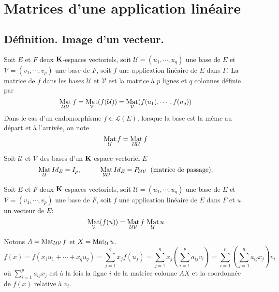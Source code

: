 \section{Matrices d'une application linéaire}
\subsection{Définition. Image d'un vecteur.}
\begin{defi}
 Soit $E$ et $F$ deux $\mathbf{K}$-espaces vectoriels, soit $\mathcal U=(u_1,\cdots,u_q)$ une base de $E$ et $\mathcal V=(v_1,\cdots,v_p)$ une base de $F$, soit $f$ une application linéaire de $E$ dans $F$. La matrice de $f$ dans les bases $\mathcal U$ et $\mathcal V$ est la matrice à $p$ lignes et $q$ colonnes définie par
\begin{displaymath}
 \mathop{\mathrm{Mat}}_{\mathcal U \mathcal V}f = \mathop{\mathrm{Mat}}_{\mathcal V}(f(\mathcal U))= \mathop{\mathrm{Mat}}_{\mathcal V}(f(u_1),\cdots,f(u_q))
\end{displaymath}
Dans le cas d'un endomorphisme $f\in\mathcal L(E)$, lorsque la base est la même au départ et à l'arrivée, on note
\begin{displaymath}
 \mathop{\mathrm{Mat}}_{\mathcal U}f =\mathop{\mathrm{Mat}}_{\mathcal U \mathcal U}f
\end{displaymath}
\end{defi}
\begin{rem}
 Soit $\mathcal U$ et $\mathcal V$ des bases d'un $\mathbf{K}$-espace vectoriel $E$
\[
 \mathop{\mathrm{Mat}}_{\mathcal U} Id_E = I_p , \hspace{1cm}
 \mathop{\mathrm{Mat}}_{\mathcal V \mathcal U}Id_E = P_{\mathcal U \mathcal V} \; \text{ (matrice de passage).}
\]
\end{rem}

\begin{propn} \label{matimagevect}
 Soit $E$ et $F$ deux $\mathbf{K}$-espaces vectoriels, soit $\mathcal U=(u_1,\cdots,u_q)$ une base de $E$ et $\mathcal V=(v_1,\cdots,v_p)$ une base de $F$, soit $f$ une application linéaire de $E$ dans $F$ et $u$ un vecteur de $E$:
\begin{displaymath}
 \mathop{\mathrm{Mat}}_{\mathcal V}(f(u)) = \mathop{\mathrm{Mat}}_{\mathcal U \mathcal V}f \, \mathop{\mathrm{Mat}}_{\mathcal U}u
\end{displaymath}
\end{propn}
\begin{demo}
Notons $A = \mathop{\mathrm{Mat}}_{\mathcal U \mathcal V}f$ et $X = \mathop{\mathrm{Mat}}_{\mathcal U}u$.
\[
 f(x) = f(x_1u_1 + \cdots + x_q u_q) = \sum_{j=1}^q x_jf(u_j)
 = \sum_{j=1}^q x_j \left( \sum_{i=1}^p a_{i j}v_i\right) 
 = \sum_{i=1}^p \left( \sum_{j=1}^q a_{i j}x_j\right)v_i
\]
où $\sum_{i=1}^p a_{i j}x_j$ est à la fois la ligne $i$ de la matrice colonne $AX$ et la coordonnée de $f(x)$ relative à $v_i$.
\end{demo}

